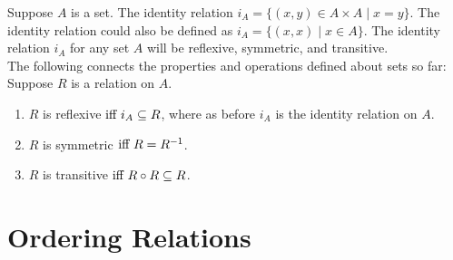 \documentclass{article}
\begin{document}
\noindent Suppose $A$ is a set. The \gls{identity relation} $i_{A} = \{(x,y) \in A \times A \mid x = y \}$. The identity relation could also be defined as $i_{A} = \{(x,x) \mid x \in A \}$. The identity relation $i_{A}$ for any set $A$ will be reflexive, symmetric, and transitive.\\

\noindent The following connects the properties and operations defined about sets so far:\\
Suppose $R$ is a relation on $A$.
\begin{enumerate}
    \item $R$ is reflexive$\text{ iff } i_{A} \subseteq R$, where as before $i_{A}$ is the identity relation on $A$.
    \item $R$ is symmetric$\text{ iff } R = R^{-1}$.
    \item $R$ is transitive$\text{ iff } R \circ R \subseteq R$.
\end{enumerate}

\section{Ordering Relations}

\clearpage
\printglossary[type=\acronymtype,style=long]  %
\printglossary[type=symbolslist,style=long]   %
\printglossary[type=main]                     %
\end{document}
